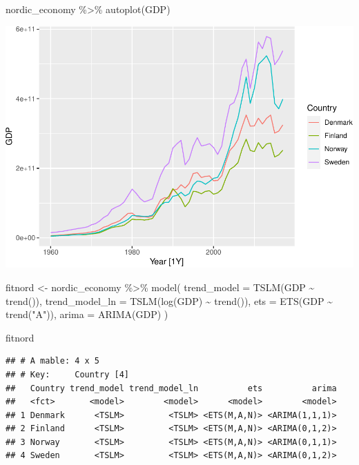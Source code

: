 \documentclass[
]{book}
\newenvironment{Shaded}{\begin{snugshade}}{\end{snugshade}}
\newcommand{\AttributeTok}[1]{\textcolor[rgb]{0.77,0.63,0.00}{#1}}
\newcommand{\FunctionTok}[1]{\textcolor[rgb]{0.00,0.00,0.00}{#1}}
\newcommand{\NormalTok}[1]{#1}
\newcommand{\OtherTok}[1]{\textcolor[rgb]{0.56,0.35,0.01}{#1}}
\newcommand{\SpecialCharTok}[1]{\textcolor[rgb]{0.00,0.00,0.00}{#1}}
\newcommand{\StringTok}[1]{\textcolor[rgb]{0.31,0.60,0.02}{#1}}
\begin{document}
\begin{Shaded}
\begin{Highlighting}[]
\NormalTok{nordic\_economy }\SpecialCharTok{\%\textgreater{}\%} \FunctionTok{autoplot}\NormalTok{(GDP)}
\end{Highlighting}
\end{Shaded}

\includegraphics{graphics/unnamed-chunk-39-1.pdf}

\begin{Shaded}
\begin{Highlighting}[]
\NormalTok{fitnord }\OtherTok{\textless{}{-}}\NormalTok{ nordic\_economy }\SpecialCharTok{\%\textgreater{}\%}
  \FunctionTok{model}\NormalTok{(}
    \AttributeTok{trend\_model =} \FunctionTok{TSLM}\NormalTok{(GDP }\SpecialCharTok{\textasciitilde{}} \FunctionTok{trend}\NormalTok{()),}
    \AttributeTok{trend\_model\_ln =} \FunctionTok{TSLM}\NormalTok{(}\FunctionTok{log}\NormalTok{(GDP) }\SpecialCharTok{\textasciitilde{}} \FunctionTok{trend}\NormalTok{()),}
    \AttributeTok{ets =} \FunctionTok{ETS}\NormalTok{(GDP }\SpecialCharTok{\textasciitilde{}} \FunctionTok{trend}\NormalTok{(}\StringTok{"A"}\NormalTok{)),}
    \AttributeTok{arima =} \FunctionTok{ARIMA}\NormalTok{(GDP)}
\NormalTok{  )}

\NormalTok{fitnord}
\end{Highlighting}
\end{Shaded}

\begin{verbatim}
## # A mable: 4 x 5
## # Key:     Country [4]
##   Country trend_model trend_model_ln          ets          arima
##   <fct>       <model>        <model>      <model>        <model>
## 1 Denmark      <TSLM>         <TSLM> <ETS(M,A,N)> <ARIMA(1,1,1)>
## 2 Finland      <TSLM>         <TSLM> <ETS(M,A,N)> <ARIMA(0,1,2)>
## 3 Norway       <TSLM>         <TSLM> <ETS(M,A,N)> <ARIMA(0,1,1)>
## 4 Sweden       <TSLM>         <TSLM> <ETS(M,A,N)> <ARIMA(0,1,2)>
\end{verbatim}
\end{document}
